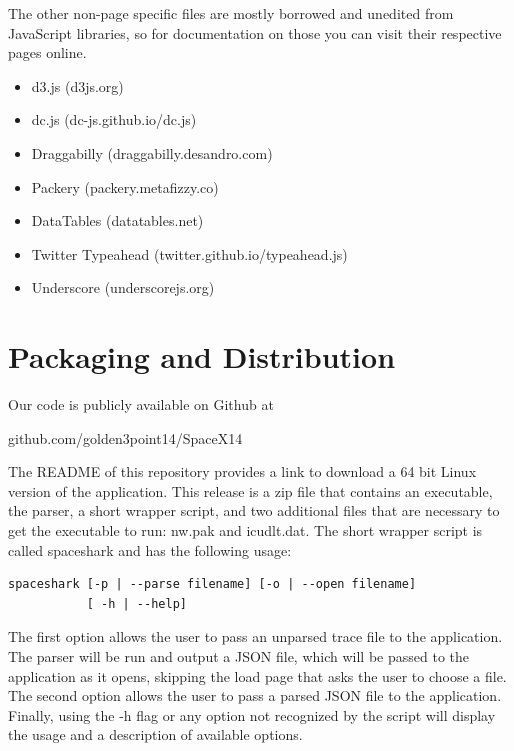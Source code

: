 \documentclass{hmcclinic}
\begin{document}
  The other non-page specific files are mostly borrowed and unedited from
  JavaScript libraries, so for documentation on those you can visit their
  respective pages online.
\begin{itemize}
\item d3.js (d3js.org)
\item dc.js (dc-js.github.io/dc.js)
\item Draggabilly (draggabilly.desandro.com)
\item Packery (packery.metafizzy.co)
\item DataTables (datatables.net)
\item Twitter Typeahead (twitter.github.io/typeahead.js)
\item Underscore (underscorejs.org)
\end{itemize}

\section{Packaging and Distribution}
  Our code is publicly available on Github at
\begin{center}
  github.com/golden3point14/SpaceX14
\end{center}
The README of this repository provides a link to download a
  64 bit Linux version of the application. This release is a zip file that
  contains an executable, the parser, a short wrapper script, and two additional
  files that are necessary to get the executable to run: nw.pak and icudlt.dat.
  The short wrapper script is called spaceshark and has the following usage:

\begin{verbatim}spaceshark [-p | --parse filename] [-o | --open filename] 
           [ -h | --help]\end{verbatim}

  The first option allows the user to pass an unparsed trace file to the
  application. The parser will be run and output a JSON file, which will be
  passed to the application as it opens, skipping the load page that asks the
  user to choose a file. The second option allows the user to pass a parsed
  JSON file to the application. Finally, using the -h flag or any option
  not recognized by the script will display the usage and a description of
  available options.
\end{document}
